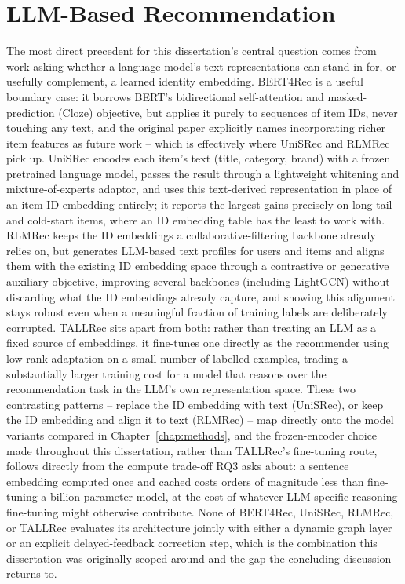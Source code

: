 \documentclass{uclthesis}
\begin{document}
\section{LLM-Based Recommendation}
The most direct precedent for this dissertation's central question comes from work asking whether a language model's text representations can stand in for, or usefully complement, a learned identity embedding. BERT4Rec \citep{sun2019bert4rec} is a useful boundary case: it borrows BERT's bidirectional self-attention and masked-prediction (Cloze) objective, but applies it purely to sequences of item IDs, never touching any text, and the original paper explicitly names incorporating richer item features as future work -- which is effectively where UniSRec and RLMRec pick up. UniSRec \citep{hou2022unisrec} encodes each item's text (title, category, brand) with a frozen pretrained language model, passes the result through a lightweight whitening and mixture-of-experts adaptor, and uses this text-derived representation in place of an item ID embedding entirely; it reports the largest gains precisely on long-tail and cold-start items, where an ID embedding table has the least to work with. RLMRec \citep{ren2024rlmrec} keeps the ID embeddings a collaborative-filtering backbone already relies on, but generates LLM-based text profiles for users and items and aligns them with the existing ID embedding space through a contrastive or generative auxiliary objective, improving several backbones (including LightGCN) without discarding what the ID embeddings already capture, and showing this alignment stays robust even when a meaningful fraction of training labels are deliberately corrupted. TALLRec \citep{bao2023tallrec} sits apart from both: rather than treating an LLM as a fixed source of embeddings, it fine-tunes one directly as the recommender using low-rank adaptation on a small number of labelled examples, trading a substantially larger training cost for a model that reasons over the recommendation task in the LLM's own representation space.
These two contrasting patterns -- replace the ID embedding with text (UniSRec), or keep the ID embedding and align it to text (RLMRec) -- map directly onto the model variants compared in Chapter~\ref{chap:methods}, and the frozen-encoder choice made throughout this dissertation, rather than TALLRec's fine-tuning route, follows directly from the compute trade-off RQ3 asks about: a sentence embedding computed once and cached costs orders of magnitude less than fine-tuning a billion-parameter model, at the cost of whatever LLM-specific reasoning fine-tuning might otherwise contribute. None of BERT4Rec, UniSRec, RLMRec, or TALLRec evaluates its architecture jointly with either a dynamic graph layer or an explicit delayed-feedback correction step, which is the combination this dissertation was originally scoped around and the gap the concluding discussion returns to.
\end{document}
